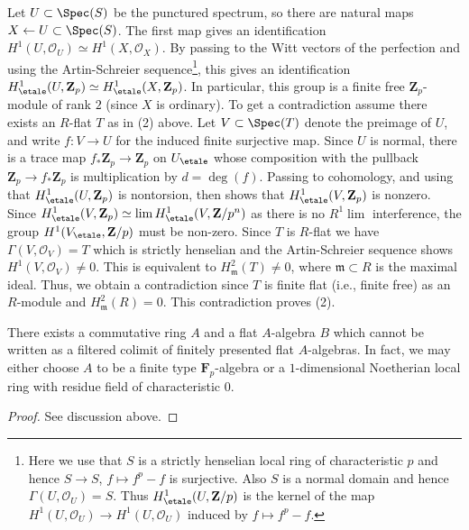 \medskip\noindent
Let $U \subset \Spec(S)$ be the punctured spectrum, so there are natural
maps $X \leftarrow U \subset \Spec(S)$. The first map gives an
identification $H^1(U, \mathcal{O}_U) \simeq H^1(X, \mathcal{O}_X)$.
By passing to the Witt vectors of the perfection and using the
Artin-Schreier sequence\footnote{Here we use that $S$ is a strictly
henselian local ring of characteristic $p$ and hence
$S \to S$, $f \mapsto f^p - f$ is surjective.
Also $S$ is a normal domain and hence
$\Gamma(U, \mathcal{O}_U) = S$. Thus $H^1_\etale(U, \mathbf{Z}/p)$
is the kernel of the map $H^1(U, \mathcal{O}_U) \to H^1(U, \mathcal{O}_U)$
induced by $f \mapsto f^p - f$.}, this gives an identification
$H^1_\etale(U, \mathbf{Z}_p) \simeq H^1_\etale(X, \mathbf{Z}_p)$.
In particular, this group is a finite free $\mathbf{Z}_p$-module of
rank $2$ (since $X$ is ordinary). To get a contradiction assume
there exists an
$R$-flat $T$ as in (2) above. Let $V \subset \Spec(T)$ denote the preimage
of $U$, and write $f : V \to U$ for the induced finite surjective map.
Since $U$ is normal, there is a trace map $f_*\mathbf{Z}_p \to \mathbf{Z}_p$
on $U_\etale$ whose composition with the pullback
$\mathbf{Z}_p \to f_*\mathbf{Z}_p$ is multiplication by $d = \deg(f)$.
Passing to cohomology, and using that $H^1_\etale(U, \mathbf{Z}_p)$
is nontorsion, then shows that $H^1_\etale(V, \mathbf{Z}_p)$ is nonzero.
Since $H^1_\etale(V, \mathbf{Z}_p) \simeq \lim H^1_\etale(V, \mathbf{Z}/p^n)$
as there is no $R^1\lim$ interference, the group
$H^1(V_\etale,\mathbf{Z}/p)$ must be non-zero. Since $T$ is $R$-flat we
have $\Gamma(V, \mathcal{O}_V) = T$ which is strictly henselian and the
Artin-Schreier sequence shows $H^1(V, \mathcal{O}_V) \neq 0$.
This is equivalent to $H^2_\mathfrak m(T) \neq 0$, where
$\mathfrak m \subset R$ is the maximal ideal. Thus, we obtain
a contradiction since $T$ is finite flat (i.e., finite free) as an
$R$-module and $H^2_\mathfrak m(R) = 0$. This contradiction proves (2).

\begin{lemma}
\label{lemma-weird-flat-map}
There exists a commutative ring $A$ and a flat $A$-algebra $B$
which cannot be written as a filtered colimit of finitely
presented flat $A$-algebras. In fact, we may either choose $A$ to
be a finite type $\mathbf{F}_p$-algebra or a $1$-dimensional
Noetherian local ring with residue field of characteristic $0$.
\end{lemma}

\begin{proof}
See discussion above.
\end{proof}












